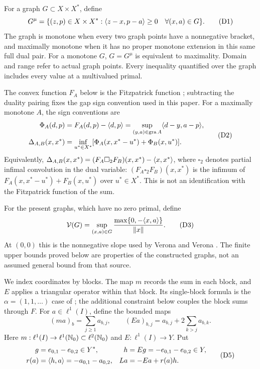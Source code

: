 For a graph $G\subset X\times X^*$, define
\begin{equation}
G^\mu=\{(z,p)\in X\times X^*:
 \langle z-x,p-a\rangle\ge0\quad\forall(x,a)\in G\}.
\tag{D1}\label{eq:D1}
\end{equation}
The graph is monotone when every two graph points have a nonnegative bracket,
and maximally monotone when it has no proper monotone extension in this same
full dual pair. For a monotone $G$, $G=G^\mu$ is equivalent to maximality.
Domain and range refer to actual graph points. Every inequality quantified
over the graph includes every value at a multivalued primal.


The convex function $F_A$ below is the Fitzpatrick function
\cite{fitzpatrick1988}; subtracting the duality pairing fixes the gap
sign convention used in this paper.
For a maximally monotone $A$, the sign conventions are
\begin{equation}
\begin{aligned}
\Phi_A(d,p)&=F_A(d,p)-\langle d,p\rangle
 =\sup_{(y,a)\in\operatorname{gra} A}\langle d-y,a-p\rangle,\\
\Delta_{A,B}(x,x^*)&=\inf_{u^*\in X^*}
 [\Phi_A(x,x^*-u^*)+\Phi_B(x,u^*)].
\end{aligned}
\tag{D2}\label{eq:D2}
\end{equation}
Equivalently, $\Delta_{A,B}(x,x^*)=(F_A\square_2 F_B)(x,x^*)
-\langle x,x^*\rangle$, where $\square_2$ denotes partial infimal convolution
in the dual variable: $(F_A\square_2 F_B)(x,x^*)$
is the infimum of $F_A(x,x^*-u^*)+F_B(x,u^*)$ over $u^*\in X^*$.
This is not an identification with the Fitzpatrick function of the sum.

For the present graphs, which have no zero primal, define
\begin{equation}
\mathcal V(G)=\sup_{(x,a)\in G}
 \frac{\max\{0,-\langle x,a\rangle\}}{\|x\|}.
\tag{D3}\label{eq:D3}
\end{equation}
At $(0,0)$ this is the nonnegative slope used by Verona and Verona
\cite{verona2008}. The finite upper bounds proved below are properties
of the constructed graphs, not an assumed general bound from that source.

We index coordinates by blocks. The map $m$ records the sum in each block,
and $E$ applies a triangular operator within that block. Its single-block
formula is the $\alpha=(1,1,\ldots)$ case of
\cite[author version, Example~4.1]{bauschkeetal2011}; the additional constraint below
couples the block sums through $F$.
For $a\in\ell^1(I)$, define the bounded maps
\begin{equation}
(ma)_b=\sum_{j\ge1}a_{b,j},\qquad
(Ea)_{b,j}=a_{b,j}+2\sum_{k>j}a_{b,k}.
\tag{D4}\label{eq:D4}
\end{equation}
Here $m:\ell^1(I)\to\ell^1(\mathbb N_0)\subset\ell^2(\mathbb N_0)$ and
$E:\ell^1(I)\to Y$. Put
\begin{equation}
\begin{aligned}
g&=e_{0,1}-e_{0,2}\in Y^*,&
h&=Eg=-e_{0,1}-e_{0,2}\in Y,\\
r(a)&=\langle h,a\rangle=-a_{0,1}-a_{0,2},&
La&=-Ea+r(a)h.
\end{aligned}
\tag{D5}\label{eq:D5}
\end{equation}


